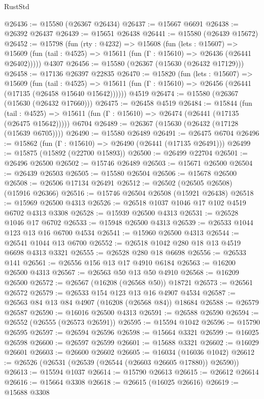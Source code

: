 \begin{lexlean}{RustStd}
\begin{coremodule}
@26436 := @15580 (@26367 @26434)
@26437 := @15667 @6691
@26438 := @26392 @26437
@26439 := @15651 @26438
@26441 := @15580 (@26439 @15672)
@26452 := @15798
    (fun (rty : @4232) =>
    @15608
      (fun (lets : @15607) =>
      @15609 (fun (tail : @4525) => @15611 (fun (Γ : @15610) => @26436 (@26441 @26402)))))
    @4307
@26456 := @15580 (@26367 (@15630 (@26432 @17129)))
@26458 := @17136 @26397 @22835
@26470 := @15820
    (fun (lets : @15607) =>
    @15609
      (fun (tail : @4525) =>
      @15611 (fun (Γ : @15610) => @26456 (@26441 (@17135 (@26458 @15640 @15642))))))
    @4519
@26474 := @15580 (@26367 (@15630 (@26432 @17660)))
@26475 := @26458 @4519
@26484 := @15844
    (fun (tail : @4525) => @15611 (fun (Γ : @15610) => @26474 (@26441 (@17135 (@26475 @15642)))))
    @6704
@26489 := @26367 (@15630 (@26432 (@17128 (@15639 @6705))))
@26490 := @15580 @26489
@26491 := @26475 @6704
@26496 := @15862 (fun (Γ : @15610) => @26490 (@26441 (@17135 @26491)))
@26499 := @15875 (@15892 (@22700 @15893))
@26500 := @26499 @22704
@26501 := @26496 @26500
@26502 := @15746 @26489
@26503 := @15671 @26500
@26504 := @26439 @26503
@26505 := @15580 @26504
@26506 := @15678 @26500
@26508 := @26506 @17134 @26491
@26512 := @26502 (@26505 @26508) (@15916 @26366)
@26516 := @15746 @26504 @26508 (@15921 @26438)
@26518 := @15969 @26500 @4313
@26526 := @26518 @1037 @1046 @17 @102 @4519 @6702 @4313 @3308
@26528 := @15939 @26500 @4313
@26531 := @26528 @1046 @17 @6702
@26533 := @15948 @26500 @4313
@26539 := @26533 @1044 @123 @13 @16 @6700 @4534
@26541 := @15960 @26500 @4313
@26544 := @26541 @1044 @13 @6700
@26552 := @26518 @1042 @280 @18 @13 @4519 @6698 @4313 @3321
@26555 := @26528 @280 @18 @6698
@26556 := @26533 @141
@26561 := @26556 @156 @13 @17 @4910 @6184
@26563 := @16200 @26500 @4313
@26567 := @26563 @50 @13 @50 @4910
@26568 := @16209 @26500
@26572 := @26567 (@16208 (@26568 @50)) @18721
@26573 := @26561 @26572
@26579 := @26533 @154 @123 @13 @16 @4907 @4534
@26587 := @26563 @84 @13 @84 @4907 (@16208 (@26568 @84)) @18684
@26588 := @26579 @26587
@26590 := @16016 @26500 @4313
@26591 := @26588 @26590
@26594 := @26552 (@26555 (@26573 @26591))
@26595 := @15594 @1042
@26596 := @15790 @26595
@26597 := @26594 @26596
@26598 := @15664 @3321
@26599 := @16025 @26598
@26600 := @26597 @26599
@26601 := @15688 @3321
@26602 := @16029 @26601
@26603 := @26600 @26602
@26605 := @16034 (@16036 @1042)
@26612 := @26526 (@26531 (@26539 (@26544 (@26603 @26605 @17880)) @26590))
@26613 := @15594 @1037
@26614 := @15790 @26613
@26615 := @26612 @26614
@26616 := @15664 @3308
@26618 := @26615 (@16025 @26616)
@26619 := @15688 @3308

\end{coremodule}
\end{lexlean}
